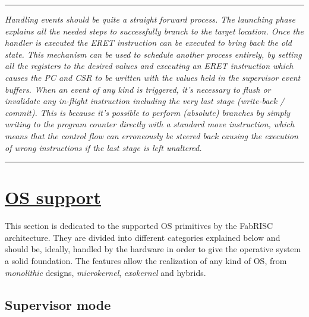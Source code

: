 \documentclass{article}
\begin{document}
        \par\noindent\rule{\textwidth}{0.4pt}
        \textit{Handling events should be quite a straight forward process. The launching phase explains all the needed steps to successfully branch to the target location. Once the handler is executed the ERET instruction can be executed to bring back the old state. This mechanism can be used to schedule another process entirely, by setting all the registers to the desired values and executing an ERET instruction which causes the PC and CSR to be written with the values held in the supervisor event buffers. When an event of any kind is triggered, it's necessary to flush or invalidate any in-flight instruction including the very last stage (write-back / commit). This is because it's possible to perform (absolute) branches by simply writing to the program counter directly with a standard move instruction, which means that the control flow can erroneously be steered back causing the execution of wrong instructions if the last stage is left unaltered.}
        \par\noindent\rule{\textwidth}{0.4pt}

        \vspace{10pt}
        
        \vspace{10pt}
        \vspace{10pt}

    \clearpage

    \section[OS support]{\LARGE\underline{OS support}} %

        This section is dedicated to the supported OS primitives by the FabRISC architecture. They are divided into different categories explained below and should be, ideally, handled by the hardware in order to give the operative system a solid foundation. The features allow the realization of any kind of OS, from \textit{monolithic} designs, \textit{microkernel}, \textit{exokernel} and hybrids.

        \subsection{Supervisor mode}
\end{document}
